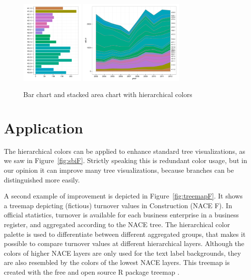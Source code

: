 \documentclass[journal]{vgtc}                %
\begin{document}
\begin{figure}[htb]
  \centering
  \includegraphics[width=1.235in]{bar_chart.pdf}
  \includegraphics[width=2.065in]{stackedarea_chart.pdf}
  \caption{Bar chart and stacked area chart with hierarchical colors}\label{fig:charts}
\end{figure}



\section{Application}\label{secapplication}
The hierarchical colors can be applied to enhance standard tree visualizations, as we saw in Figure~\ref{fig:sbiF}. Strictly speaking this is redundant color usage, but in our opinion it can improve many tree visualizations, because branches can be distinguished more easily. 

A second example of improvement is depicted in Figure~\ref{fig:treemapF}. It shows a treemap depicting (fictious) turnover values in Construction (NACE F). In official statistics, turnover is available for each business enterprise in a business register, and aggregated according to the NACE tree. The hierarchical color palette is used to differentiate between different aggregated groups, that makes it possible to compare turnover values at different hierarchical layers. Although the colors of higher NACE layers are only used for the text label backgrounds, they are also resembled by the colors of the lowest NACE layers. This treemap is created with the free and open source R package treemap \cite{treemap}.
\end{document}
